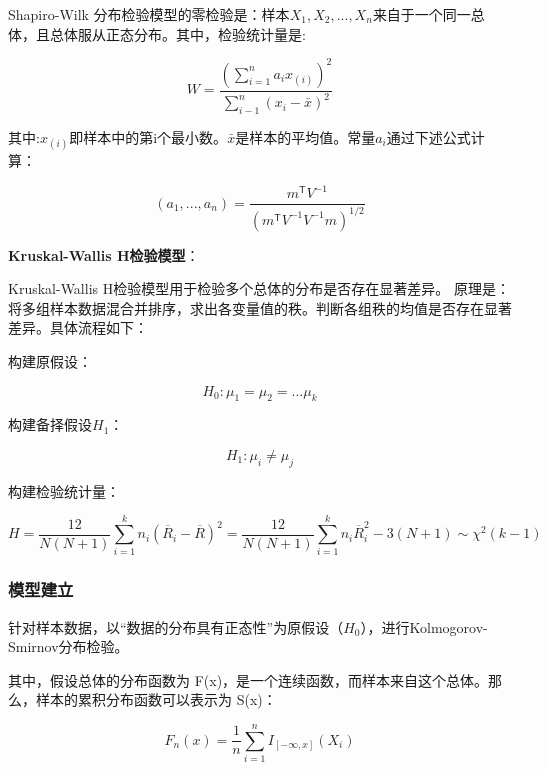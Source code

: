 \documentclass[bwprint]{gmcmthesis}
\begin{document}
Shapiro-Wilk 分布检验模型\cite{Shapiro-Wilk}的零检验是：样本$X_1,X_2,...,X_n$来自于一个同一总体，且总体服从正态分布。其中，检验统计量是:

\begin{equation}
W=\frac{\left(\sum_{i=1}^na_ix_{(i)}\right)^2}{\sum_{i-1}^n(x_i-\bar{x})^2}
\end{equation}

\noindent 其中:$x_{(i)}$即样本中的第i个最小数。$\bar{x}$是样本的平均值。常量$a_i$通过下述公式计算：

\begin{equation}
(a_1,...,a_n)=\frac{m^{\mathsf{T}}V^{-1}}{(m^{\mathsf{T}}V^{-1}V^{-1}m)^{1/2}}
\end{equation}


\textbf{Kruskal-Wallis H检验模型}：

Kruskal-Wallis H检验模型\cite{Kruskal-Wallis-H}用于检验多个总体的分布是否存在显著差异。
原理是：将多组样本数据混合并排序，求出各变量值的秩。判断各组秩的均值是否存在显著差异。具体流程如下：


构建原假设：

\begin{equation}
H_0{:}\mu_1=\mu_2=...\mu_k
\end{equation}

构建备择假设$H_1$：

\begin{equation}
H_1{:}\mu_{i}\neq\mu_{j}
\end{equation}

构建检验统计量：

\begin{equation}
H=\frac{12}{N(N+1)}\sum_{i=1}^kn_i(\overline{R}_i-\overline{R})^2=\frac{12}{N(N+1)}\sum_{i=1}^kn_i\overline{R}_i^2-3(N+1)\sim\chi^2(k-1)
\end{equation}



\subsubsection{模型建立}



针对样本数据，以“数据的分布具有正态性”为原假设（$H_0$），进行Kolmogorov-Smirnov分布检验。


其中，假设总体的分布函数为 F(x)，是一个连续函数，而样本来自这个总体。那么，样本的累积分布函数可以表示为 S(x)：

\begin{equation}
F_n(x)=\frac{1}{n}\sum_{i=1}^nI_{[-\infty,x]}(X_i)
\end{equation}
\end{document}
